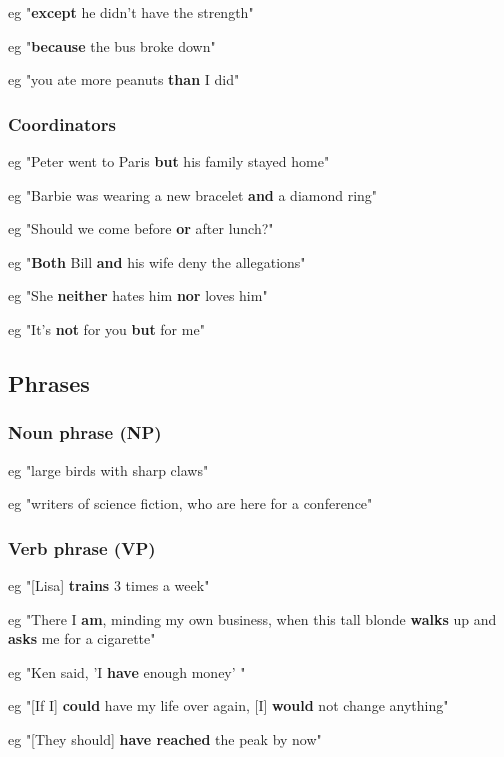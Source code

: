 eg "\textbf{except} he didn't have the strength"



eg "\textbf{because} the bus broke down"



eg "you ate more peanuts \textbf{than} I did"

\subsubsection{Coordinators}

eg "Peter went to Paris \textbf{but} his family stayed home"

eg "Barbie was wearing a new bracelet \textbf{and} a diamond ring"

eg "Should we come before \textbf{or} after lunch?"

eg "\textbf{Both} Bill \textbf{and} his wife deny the allegations"

eg "She \textbf{neither} hates him \textbf{nor} loves him"

eg "It's \textbf{not} for you \textbf{but} for me"

\subsection{Phrases}

\subsubsection{Noun phrase (NP)}

eg "large birds with sharp claws"

eg "writers of science fiction, who are here for a conference"

\subsubsection{Verb phrase (VP)}

eg "[Lisa] \textbf{trains} 3 times a week"

eg "There I \textbf{am}, minding my own business, when this tall blonde \textbf{walks} up and \textbf{asks} me for a cigarette"

eg "Ken said, 'I \textbf{have} enough money' "

eg "[If I] \textbf{could} have my life over again, [I] \textbf{would} not change anything"

eg "[They should] \textbf{have reached} the peak by now"

